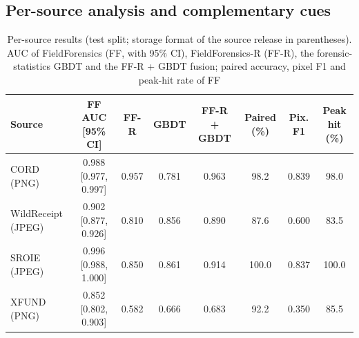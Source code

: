 \documentclass[conference]{IEEEtran}
\begin{document}
\subsection{Per-source analysis and complementary cues}
\begin{table}[t]
\centering
\caption{Per-source results (test split; storage format of the source release in parentheses). AUC of FieldForensics (FF, with 95\% CI), FieldForensics-R (FF-R), the forensic-statistics GBDT and the FF-R + GBDT fusion; paired accuracy, pixel F1 and peak-hit rate of FF}
\label{tab:source}
\footnotesize
\setlength{\tabcolsep}{3pt}
\begin{tabular}{lccccccc}
\toprule
Source & FF AUC [95\% CI] & FF-R & GBDT & FF-R + GBDT & Paired (\%) & Pix. F1 & Peak hit (\%) \\
\midrule
CORD (PNG) & 0.988 [0.977, 0.997] & 0.957 & 0.781 & 0.963 & 98.2 & 0.839 & 98.0 \\
WildReceipt (JPEG) & 0.902 [0.877, 0.926] & 0.810 & 0.856 & 0.890 & 87.6 & 0.600 & 83.5 \\
SROIE (JPEG) & 0.996 [0.988, 1.000] & 0.850 & 0.861 & 0.914 & 100.0 & 0.837 & 100.0 \\
XFUND (PNG) & 0.852 [0.802, 0.903] & 0.582 & 0.666 & 0.683 & 92.2 & 0.350 & 85.5 \\
\bottomrule
\end{tabular}
\end{table}
\end{document}
